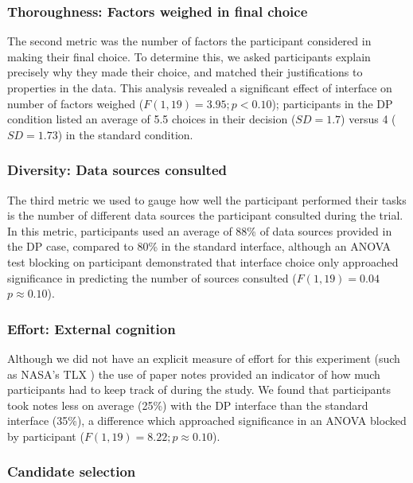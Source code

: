 \documentclass{sigchi}
\begin{document}
\subsubsection{Thoroughness: Factors weighed in final choice}
The second metric was the number of factors the participant considered in making their final choice. To determine this, we asked participants explain precisely why they made their choice, and matched their justifications to properties in the data.  This analysis revealed a significant effect of interface on number of factors weighed ($F(1,19)=3.95; p<0.10$); participants in the DP condition listed an average of 5.5 choices in their decision ($SD=1.7$) versus 4 ($SD=1.73$) in the standard condition.

\subsubsection{Diversity: Data sources consulted}
The third metric we used to gauge how well the participant performed their tasks is the number of different data sources the participant consulted during the trial. In this metric, participants used an average of 88\% of data sources provided in the DP case, compared to 80\% in the standard interface, although an ANOVA test blocking on participant demonstrated that interface choice only approached significance in predicting the number of sources consulted ($F(1,19)=0.04$ $p\approx0.10$).

\subsubsection{Effort: External cognition}
Although we did not have an explicit measure of effort for this experiment (such as NASA's TLX \cite{tlx}) the use of paper notes provided an indicator of how much participants had to keep track of during the study.  We found that participants took notes less on average (25\%) with the DP interface than the standard interface (35\%), a difference which approached significance in an ANOVA blocked by participant ($F(1,19)= 8.22; p\approx0.10$).

\subsubsection{Candidate selection}
\end{document}
